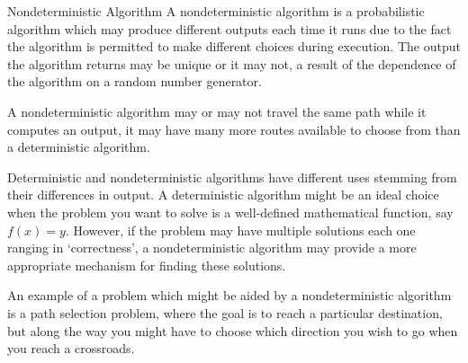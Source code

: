 \medskip
\begin{defn}{Nondeterministic Algorithm}
    A nondeterministic algorithm is a probabilistic algorithm which may produce different outputs each time it runs due to the fact the algorithm is permitted to make different choices during execution. The output the algorithm returns may be unique or it may not, a result of the dependence of the algorithm on a random number generator. 
\end{defn}

\medskip


A nondeterministic algorithm may or may not travel the same path while it computes an output, it may have many more routes available to choose from than a deterministic algorithm. 


Deterministic and nondeterministic algorithms have different uses stemming from their differences in output. A deterministic algorithm might be an ideal choice when the problem you want to solve is a well-defined mathematical function, say $f(x) =y$. However, if the problem may have multiple solutions each one ranging in `correctness', a nondeterministic algorithm may provide a more appropriate mechanism for finding these solutions. 


An example of a problem which might be aided by a nondeterministic algorithm is a path selection problem, where the goal is to reach a particular destination, but along the way you might have to choose which direction you wish to go when you reach a crossroads. 